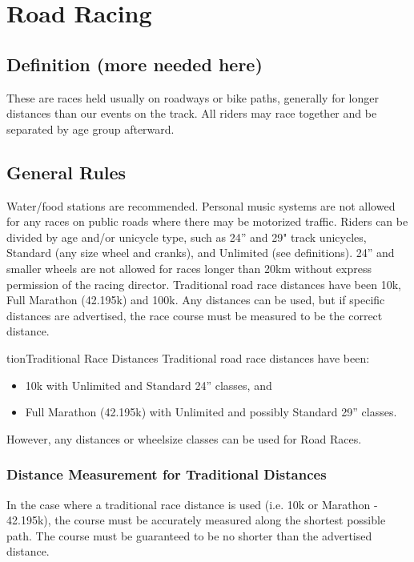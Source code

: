 \chapter{Road Racing}

\section{Definition (more needed here)}
These are races held usually on roadways or bike paths, generally for longer distances than our events on the track. All riders may race together and be separated by age group afterward.

\section{General Rules}
Water/food stations are recommended. Personal music systems are not allowed for any races on public roads where there may be motorized traffic. Riders can be divided by age and/or unicycle type, such as 24” and 29" track unicycles, Standard (any size wheel and cranks), and Unlimited (see definitions). 24” and smaller wheels are not allowed for races longer than 20km without express permission of the racing director. Traditional road race distances have been 10k, Full Marathon (42.195k) and 100k. Any distances can be used, but if specific distances are advertised, the race course must be measured to be the correct distance.

\/tion{Traditional Race Distances}
Traditional road race distances have been: 
\begin{itemize}
\item 10k with Unlimited and Standard 24” classes, and 
\item Full Marathon (42.195k) with Unlimited and possibly Standard 29” classes.
\end{itemize}
However, any distances or wheelsize classes can be used for Road Races.

\subsection {Distance Measurement for Traditional Distances}
In the case where a traditional race distance is used (i.e. 10k or Marathon - 42.195k), the course must be accurately measured along the shortest possible path. The course must be guaranteed to be no shorter than the advertised distance.

